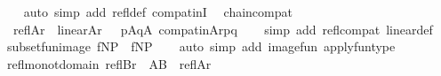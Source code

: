 \begin{isabellebody}
%
\isadelimproof
\ \ %
\endisadelimproof
%
\isatagproof
{}\isamarkupfalse%
\ {\isacharparenleft}{\kern0pt}auto\ simp\ add{\isacharcolon}{\kern0pt}\ refl{\isacharunderscore}{\kern0pt}def\ compat{\isacharunderscore}{\kern0pt}inI{\isacharparenright}{\kern0pt}%
\endisatagproof
{\isafoldproof}%
%
\isadelimproof
\isanewline
%
\endisadelimproof
\isanewline
{}\isamarkupfalse%
\ \ chain{\isacharunderscore}{\kern0pt}compat{\isacharcolon}{\kern0pt}\isanewline
\ \ {\isachardoublequoteopen}refl{\isacharparenleft}{\kern0pt}A{\isacharcomma}{\kern0pt}r{\isacharparenright}{\kern0pt}\ {\isasymLongrightarrow}\ linear{\isacharparenleft}{\kern0pt}A{\isacharcomma}{\kern0pt}r{\isacharparenright}{\kern0pt}\ {\isasymLongrightarrow}\ \ {\isacharparenleft}{\kern0pt}{\isasymforall}p{\isasymin}A{\isachardot}{\kern0pt}{\isasymforall}q{\isasymin}A{\isachardot}{\kern0pt}\ compat{\isacharunderscore}{\kern0pt}in{\isacharparenleft}{\kern0pt}A{\isacharcomma}{\kern0pt}r{\isacharcomma}{\kern0pt}p{\isacharcomma}{\kern0pt}q{\isacharparenright}{\kern0pt}{\isacharparenright}{\kern0pt}{\isachardoublequoteclose}\isanewline
%
\isadelimproof
\ \ %
\endisadelimproof
%
\isatagproof
{}\isamarkupfalse%
\ {\isacharparenleft}{\kern0pt}simp\ add{\isacharcolon}{\kern0pt}\ refl{\isacharunderscore}{\kern0pt}compat\ linear{\isacharunderscore}{\kern0pt}def{\isacharparenright}{\kern0pt}%
\endisatagproof
{\isafoldproof}%
%
\isadelimproof
\isanewline
%
\endisadelimproof
\isanewline
{}\isamarkupfalse%
\ subset{\isacharunderscore}{\kern0pt}fun{\isacharunderscore}{\kern0pt}image{\isacharcolon}{\kern0pt}\ {\isachardoublequoteopen}f{\isacharcolon}{\kern0pt}N{\isasymrightarrow}P\ {\isasymLongrightarrow}\ f{\isacharbackquote}{\kern0pt}{\isacharbackquote}{\kern0pt}N{\isasymsubseteq}P{\isachardoublequoteclose}\isanewline
%
\isadelimproof
\ \ %
\endisadelimproof
%
\isatagproof
{}\isamarkupfalse%
\ {\isacharparenleft}{\kern0pt}auto\ simp\ add{\isacharcolon}{\kern0pt}\ image{\isacharunderscore}{\kern0pt}fun\ apply{\isacharunderscore}{\kern0pt}funtype{\isacharparenright}{\kern0pt}%
\endisatagproof
{\isafoldproof}%
%
\isadelimproof
\isanewline
%
\endisadelimproof
\isanewline
{}\isamarkupfalse%
\ refl{\isacharunderscore}{\kern0pt}monot{\isacharunderscore}{\kern0pt}domain{\isacharcolon}{\kern0pt}\ {\isachardoublequoteopen}refl{\isacharparenleft}{\kern0pt}B{\isacharcomma}{\kern0pt}r{\isacharparenright}{\kern0pt}\ {\isasymLongrightarrow}\ A{\isasymsubseteq}B\ {\isasymLongrightarrow}\ refl{\isacharparenleft}{\kern0pt}A{\isacharcomma}{\kern0pt}r{\isacharparenright}{\kern0pt}{\isachardoublequoteclose}\ \ \isanewline

\end{isabellebody}
